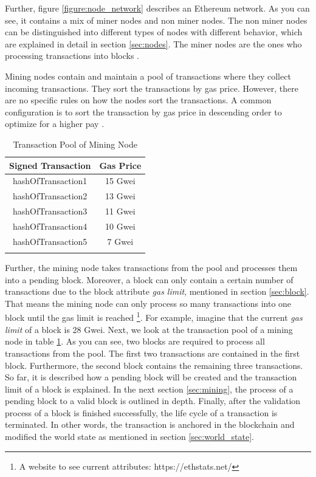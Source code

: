 \clearpage

Further, figure \ref{figure:node_network} describes an Ethereum network. 
As you can see, it contains a mix of miner nodes and non miner nodes. 
The non miner nodes can be distinguished into different types of nodes with different 
behavior, which are explained in detail in section \ref{sec:nodes}. 
The miner nodes are the ones who processing transactions into blocks . 

Mining nodes contain and maintain a pool of transactions where they collect incoming transactions. 
They sort the transactions by gas price. 
However, there are no specific rules on how the nodes sort the transactions. 
A common configuration is to sort the transaction by gas price in descending order to 
optimize for a higher pay .

\begin{longtable}{c|c}
	\hline
	Signed Transaction & Gas Price \\
	\hline
	hashOfTransaction1 & 15 Gwei \\
	hashOfTransaction2 & 13 Gwei \\
	hashOfTransaction3 & 11 Gwei \\
	hashOfTransaction4 & 10 Gwei \\
	hashOfTransaction5 & 7 Gwei \\
	\hline
	\caption{Transaction Pool of Mining Node}
	\label{table:sorted_gas_prices}
\end{longtable} 

Further, the mining node takes transactions from the pool and processes them into a pending block. 
Moreover, a block can only contain a certain number of transactions due to the block 
attribute \textit{gas limit}, mentioned in section \ref{sec:block}. 
That means the mining node can only process so many transactions into one 
block until the gas limit is reached \footnote{A website to see 
current attributes: https://ethstats.net/}. For example, 
imagine that the current \textit{gas limit} of a block is 28 Gwei. 
Next, we look at the transaction pool of a mining node in 
table \ref{table:sorted_gas_prices}. As you can see, two blocks are 
required to process all transactions from the pool. The first two transactions 
are contained in the first block. Furthermore, the second block contains the remaining 
three transactions. 
So far, it is described how a pending block will be created and the transaction 
limit of a block is explained. In the next section \ref{sec:mining}, 
the process of a pending block to a valid block is outlined in depth. 
Finally, after the validation process of a block is finished successfully, 
the life cycle of a transaction is terminated. In other words, the transaction is anchored 
in the blockchain and modified the world state as mentioned in section \ref{sec:world_state}.

